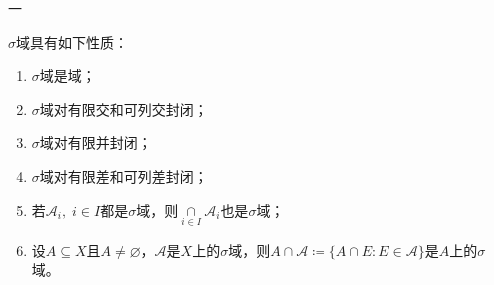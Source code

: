 一
\begin{property}\label{prop:SigmaField}
	$\sigma$域具有如下性质：
	\begin{enumerate}
		\item $\sigma$域是域；
		\item $\sigma$域对有限交和可列交封闭；
		\item $\sigma$域对有限并封闭；
		\item $\sigma$域对有限差和可列差封闭；
		\item 若$\mathscr{A}_i,\;i\in I$都是$\sigma$域，则$\underset{i\in I}{\overset{}{\cap}}\mathscr{A}_i$也是$\sigma$域；
		\item 设$A\subseteq X$且$A\ne\varnothing$，$\mathscr{A}$是$X$上的$\sigma$域，则$A\cap\mathscr{A}\coloneq\{A\cap E:E\in\mathscr{A}\}$是$A$上的$\sigma$域。
	\end{enumerate}
\end{property}

